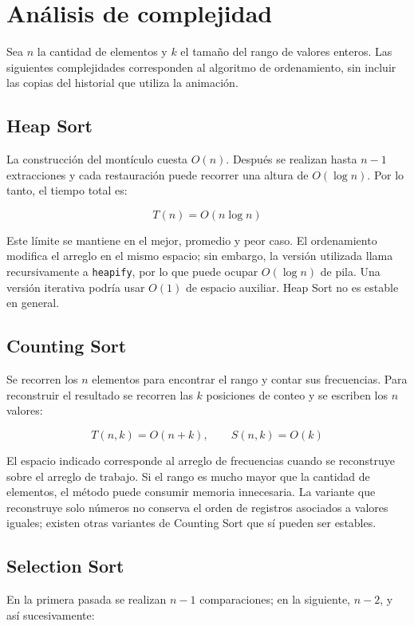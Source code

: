 \documentclass[12pt,a4paper]{article}
\begin{document}
\section{Análisis de complejidad}

Sea \(n\) la cantidad de elementos y \(k\) el tamaño del rango de valores enteros. Las siguientes complejidades corresponden al algoritmo de ordenamiento, sin incluir las copias del historial que utiliza la animación.

\subsection{Heap Sort}

La construcción del montículo cuesta \(O(n)\). Después se realizan hasta \(n-1\) extracciones y cada restauración puede recorrer una altura de \(O(\log n)\). Por lo tanto, el tiempo total es:

\[
T(n)=O(n\log n)
\]

Este límite se mantiene en el mejor, promedio y peor caso. El ordenamiento modifica el arreglo en el mismo espacio; sin embargo, la versión utilizada llama recursivamente a \texttt{heapify}, por lo que puede ocupar \(O(\log n)\) de pila. Una versión iterativa podría usar \(O(1)\) de espacio auxiliar. Heap Sort no es estable en general.

\subsection{Counting Sort}

Se recorren los \(n\) elementos para encontrar el rango y contar sus frecuencias. Para reconstruir el resultado se recorren las \(k\) posiciones de conteo y se escriben los \(n\) valores:

\[
T(n,k)=O(n+k), \qquad S(n,k)=O(k)
\]

El espacio indicado corresponde al arreglo de frecuencias cuando se reconstruye sobre el arreglo de trabajo. Si el rango es mucho mayor que la cantidad de elementos, el método puede consumir memoria innecesaria. La variante que reconstruye solo números no conserva el orden de registros asociados a valores iguales; existen otras variantes de Counting Sort que sí pueden ser estables.

\subsection{Selection Sort}

En la primera pasada se realizan \(n-1\) comparaciones; en la siguiente, \(n-2\), y así sucesivamente:
\end{document}
